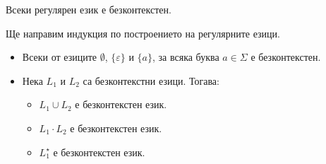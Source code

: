 \begin{important}
  \begin{theorem}
    Всеки регулярен език е безконтекстен.
  \end{theorem}
\end{important}
\begin{hint}
  Ще направим индукция по построението на регулярните езици.
  \begin{itemize}
  \item
    Всеки от езиците $\emptyset$, $\{\varepsilon\}$ и $\{a\}$, за всяка буква $a \in \Sigma$ е безконтекстен.
  \item
    Нека $L_1$ и $L_2$ са безконтекстни езици. Тогава:
    \begin{itemize}
    \item
      $L_1 \cup L_2$ е безконтекстен език.
    \item
      $L_1 \cdot L_2$ е безконтекстен език.
    \item
      $L^\star_1$ е безконтекстен език.
    \end{itemize}
  \end{itemize}
\end{hint}



